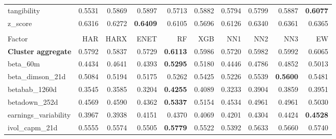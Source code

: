 \begin{longtable}{>{\raggedright\arraybackslash}p{2.6cm}rrrrrrrrr}
tangibility & 0.5531 & \cellcolor{blue!10}0.5869 & \cellcolor{blue!10}0.5897 & \cellcolor{blue!10}0.5713 & \cellcolor{blue!10}0.5882 & \cellcolor{blue!10}0.5794 & \cellcolor{blue!10}0.5799 & \cellcolor{blue!10}0.5887 & \textbf{\cellcolor{blue!10}0.6077} \\
z\_score & 0.6316 & 0.6272 & \textbf{\cellcolor{blue!10}0.6409} & 0.6105 & 0.5696 & 0.6126 & \cellcolor{blue!10}0.6340 & \cellcolor{blue!10}0.6361 & \cellcolor{blue!10}0.6365 \\
\hline
\multicolumn{10}{@{}l}{\textit{Panel E. Low Risk}} \\
\hline
Factor & HAR & HARX & ENET & RF & XGB & NN1 & NN2 & NN3 & EW \\
\hline
\textbf{Cluster aggregate} & 0.5792 & \cellcolor{blue!10}0.5837 & 0.5729 & \textbf{\cellcolor{blue!10}0.6113} & \cellcolor{blue!10}0.5986 & 0.5720 & \cellcolor{blue!10}0.5982 & \cellcolor{blue!10}0.5992 & \cellcolor{blue!10}0.6065 \\
beta\_60m & 0.4434 & \cellcolor{blue!10}0.4641 & 0.4393 & \textbf{\cellcolor{blue!10}0.5295} & \cellcolor{blue!10}0.5180 & \cellcolor{blue!10}0.4446 & \cellcolor{blue!10}0.4786 & \cellcolor{blue!10}0.4852 & \cellcolor{blue!10}0.5013 \\
beta\_dimson\_21d & 0.5084 & \cellcolor{blue!10}0.5194 & \cellcolor{blue!10}0.5175 & \cellcolor{blue!10}0.5262 & \cellcolor{blue!10}0.5425 & \cellcolor{blue!10}0.5226 & \cellcolor{blue!10}0.5539 & \textbf{\cellcolor{blue!10}0.5600} & \cellcolor{blue!10}0.5481 \\
betabab\_1260d & 0.3545 & \cellcolor{blue!10}0.3585 & 0.3204 & \textbf{\cellcolor{blue!10}0.4255} & \cellcolor{blue!10}0.4089 & 0.3233 & \cellcolor{blue!10}0.3904 & \cellcolor{blue!10}0.3859 & \cellcolor{blue!10}0.3951 \\
betadown\_252d & 0.4569 & \cellcolor{blue!10}0.4590 & 0.4362 & \textbf{\cellcolor{blue!10}0.5337} & \cellcolor{blue!10}0.5154 & 0.4534 & \cellcolor{blue!10}0.4961 & \cellcolor{blue!10}0.4961 & \cellcolor{blue!10}0.5030 \\
earnings\_variability & 0.3967 & 0.3938 & \cellcolor{blue!10}0.4151 & \cellcolor{blue!10}0.4370 & \cellcolor{blue!10}0.4069 & \cellcolor{blue!10}0.4201 & \cellcolor{blue!10}0.4304 & \cellcolor{blue!10}0.4424 & \textbf{\cellcolor{blue!10}0.4528} \\
ivol\_capm\_21d & 0.5555 & \cellcolor{blue!10}0.5574 & 0.5505 & \textbf{\cellcolor{blue!10}0.5779} & 0.5522 & 0.5392 & \cellcolor{blue!10}0.5633 & \cellcolor{blue!10}0.5660 & \cellcolor{blue!10}0.5740 \\

\end{longtable}
